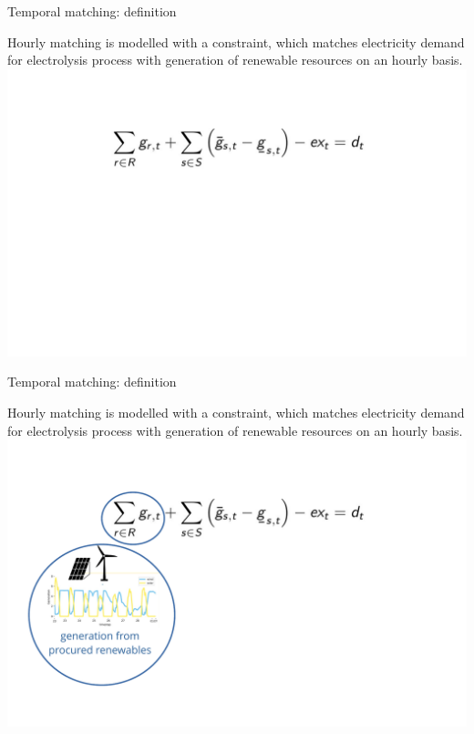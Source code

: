 \begin{frame}{Temporal matching: definition}
	
	\alert{Hourly matching} is modelled with a constraint, 
	which matches electricity demand for electrolysis process with generation of renewable resources on an hourly basis. 
	\centering
	\includegraphics[width=0.6\linewidth, clip, trim={0cm 0cm 0cm 0cm}]{images/hourly_eq_explained_v0}


\end{frame}
\begin{frame}{Temporal matching: definition}
	\addtocounter{framenumber}{-1}
	\alert{Hourly matching} is modelled with a constraint, 
	which matches electricity demand for electrolysis process with generation of renewable resources on an hourly basis. 
	\centering
	\includegraphics[width=0.6\linewidth, clip, trim={0cm 0cm 0cm 0cm}]{images/hourly_eq_explained_v1}
	

\end{frame}
